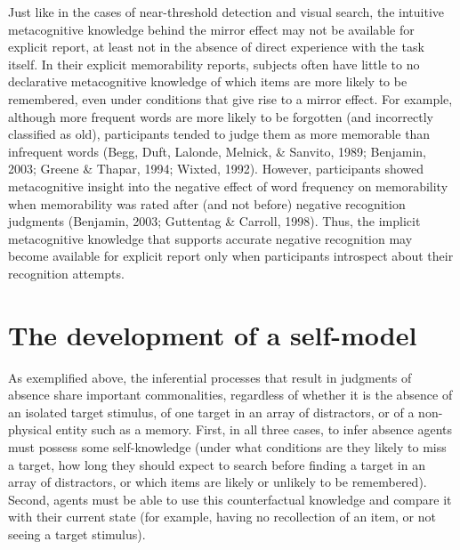 \documentclass[12pt,twoside]{reedthesis}
\begin{document}
Just like in the cases of near-threshold detection and visual search, the intuitive metacognitive knowledge behind the mirror effect may not be available for explicit report, at least not in the absence of direct experience with the task itself. In their explicit memorability reports, subjects often have little to no declarative metacognitive knowledge of which items are more likely to be remembered, even under conditions that give rise to a mirror effect. For example, although more frequent words are more likely to be forgotten (and incorrectly classified as old), participants tended to judge them as more memorable than infrequent words (Begg, Duft, Lalonde, Melnick, \& Sanvito, 1989; Benjamin, 2003; Greene \& Thapar, 1994; Wixted, 1992). However, participants showed metacognitive insight into the negative effect of word frequency on memorability when memorability was rated after (and not before) negative recognition judgments (Benjamin, 2003; Guttentag \& Carroll, 1998). Thus, the implicit metacognitive knowledge that supports accurate negative recognition may become available for explicit report only when participants introspect about their recognition attempts.

\hypertarget{the-development-of-a-self-model}{%
\section{The development of a self-model}\label{the-development-of-a-self-model}}

As exemplified above, the inferential processes that result in judgments of absence share important commonalities, regardless of whether it is the absence of an isolated target stimulus, of one target in an array of distractors, or of a non-physical entity such as a memory. First, in all three cases, to infer absence agents must possess some self-knowledge (under what conditions are they likely to miss a target, how long they should expect to search before finding a target in an array of distractors, or which items are likely or unlikely to be remembered). Second, agents must be able to use this counterfactual knowledge and compare it with their current state (for example, having no recollection of an item, or not seeing a target stimulus).
\end{document}
